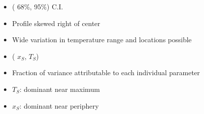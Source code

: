 \documentclass[9pt]{beamer}
\begin{document}
\begin{frame}
\begin{minipage}[t]{0.45\linewidth}
\begin{itemize}
\item ({\color{blue} 68$\%$}, {\color{red} 95$\%$}) C.I.
\item Profile skewed right of center
\item Wide variation in temperature range and locations possible
\end{itemize}
\end{minipage}
\begin{minipage}[t]{0.45\linewidth}
\begin{itemize}
\item ({\color{blue} $x_S$}, {\color{red} $T_S$})
\item Fraction of variance attributable to each individual parameter
\item {\color{red} $T_S$}: dominant near maximum
\item {\color{blue} $x_S$}: dominant near periphery
\end{itemize}
\end{minipage}
\end{frame}
\end{document}
